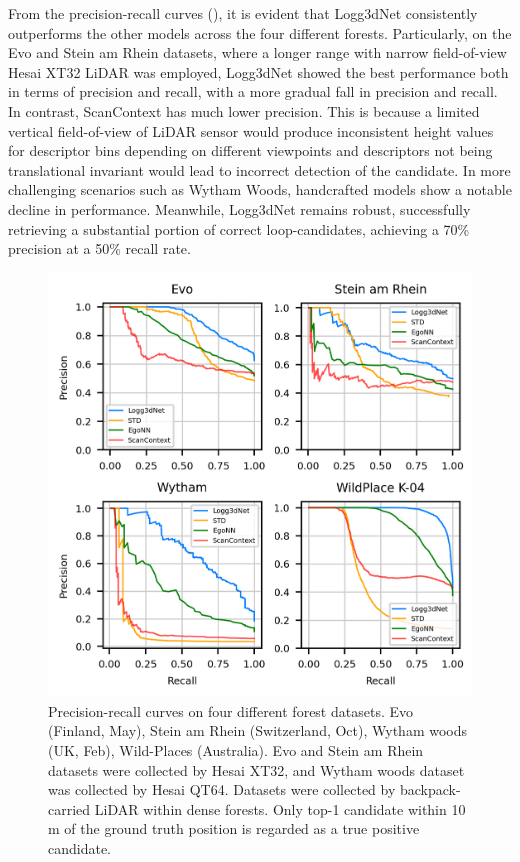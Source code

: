 From the precision-recall curves (), it is evident that Logg3dNet consistently outperforms the other models across the four different forests. Particularly, on the Evo and Stein am Rhein datasets, where a longer range with narrow field-of-view Hesai XT32 LiDAR was employed, Logg3dNet showed the best performance both in terms of precision and recall, with a more gradual fall in precision and recall.
In contrast, ScanContext has much lower precision. This is because a limited vertical field-of-view of LiDAR sensor would produce inconsistent height values for descriptor bins depending on different viewpoints and descriptors not being translational invariant would lead to incorrect detection of the candidate. In more challenging scenarios such as Wytham Woods, handcrafted models show a notable decline in performance. Meanwhile, Logg3dNet remains robust, successfully retrieving a substantial portion of correct loop-candidates, achieving a 70\% precision at a 50\% recall rate. 
\begin{figure}[htbp]
  \centering
  \includegraphics[width=0.9\linewidth]{pics/exp_1.1_pr_curves}
  \caption{Precision-recall curves on four different forest datasets. Evo (Finland, May), Stein am Rhein (Switzerland, Oct), Wytham woods (UK, Feb), Wild-Places \cite{knights2023icra} (Australia).
  Evo and Stein am Rhein datasets were collected by Hesai XT32, and Wytham woods dataset was collected by Hesai QT64. Datasets were collected by backpack-carried LiDAR within dense forests. Only top-1 candidate within 10\,m of the ground truth position is regarded as a true positive candidate.}
  \label{fig:pr_curves}
\end{figure}

